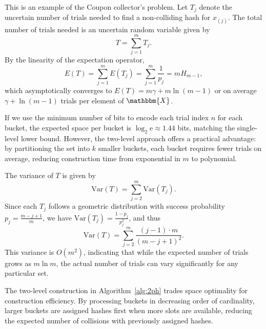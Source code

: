 \documentclass[hidelinks,11pt,final]{article}
\theoremstyle{plain}
\begin{document}
This is an example of the Coupon collector's problem.
Let $T_j$ denote the uncertain number of trials needed to find a non-colliding hash for $x_{(j)}$.
The total number of trials needed is an uncertain random variable given by
\begin{equation}
T = \sum_{j=1}^{m} T_j.
\end{equation}
By the linearity of the expectation operator,
\begin{equation}
E(T) = \sum_{j=1}^{m} E(T_j) = \sum_{j=1}^{m} \frac{1}{p_j} = m H_{m-1},
\end{equation}
which asymptotically converges to $E(T) = m \gamma + m \ln(m-1)$ or on average $\gamma + \ln (m-1)$ trials per element of $\mathbbm{X}$.

If we use the minimum number of bits to encode each trial index $n$ for each bucket, the expected space per bucket is $\log_2 \mathrm{e} \approx 1.44$ bits, matching the single-level lower bound. However, the two-level approach offers a practical advantage: by partitioning the set into $k$ smaller buckets, each bucket requires fewer trials on average, reducing construction time from exponential in $m$ to polynomial.

The variance of $T$ is given by
\begin{equation}
\mathrm{Var}(T) = \sum_{j=2}^{m} \mathrm{Var}(T_j).
\end{equation}
Since each $T_j$ follows a geometric distribution with success probability $p_j = \frac{m-j+1}{m}$, we have $\mathrm{Var}(T_j) = \frac{1-p_j}{p_j^2}$, and thus
\begin{equation}
\mathrm{Var}(T) = \sum_{j=2}^{m} \frac{(j-1) \cdot m}{(m-j+1)^2}.
\end{equation}
This variance is $O(m^2)$, indicating that while the expected number of trials grows as $m \ln m$, the actual number of trials can vary significantly for any particular set.

The two-level construction in Algorithm~\ref{alg:2ph} trades space optimality for construction efficiency. By processing buckets in decreasing order of cardinality, larger buckets are assigned hashes first when more slots are available, reducing the expected number of collisions with previously assigned hashes.

\end{document}
